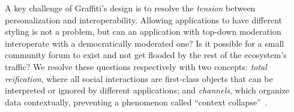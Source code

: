



A key challenge of Graffiti's design is to resolve
the \emph{tension} between personalization and interoperability.
Allowing applications to have different styling is
not a problem, but can an application with top-down
moderation interoperate with a democratically moderated one?
Is it possible for a small community forum to exist and
not get flooded by the rest of the ecosystem's traffic?
We resolve these questions respectively with two concepts: \emph{total reification},
where all social interactions
are first-class objects that
can be interpreted or ignored by different applications;
and \emph{channels}, which organize data contextually,
preventing a phenomenon called ``context collapse''~\cite{contextcollapse}.


